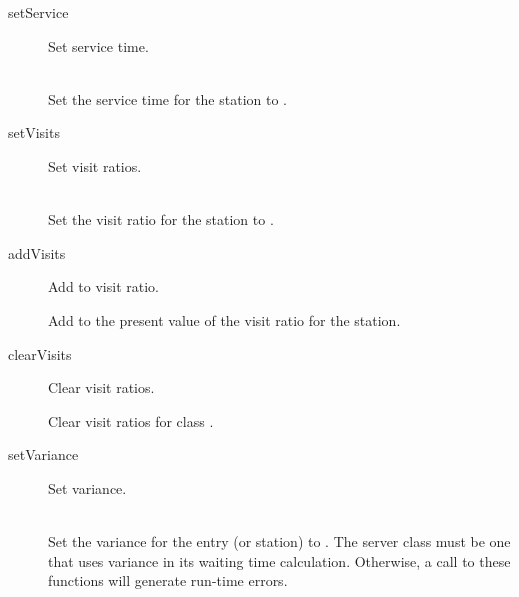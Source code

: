 \begin{description}
\item[setService] \texonly{---} Set service time.\\
  \\

  Set the service time for the station to .  

\item[setVisits] \texonly{---} Set visit ratios.\\
  \\

  Set the visit ratio for the station to .

\item[addVisits] \texonly{---} Add to visit ratio.\\

  Add  to the present value of the visit ratio for the station.

\item[clearVisits] \texonly{---} Clear visit ratios.\\

  Clear visit ratios for class .

\item[setVariance] \texonly{---} Set variance.\\
  \\

  Set the variance for the entry (or station) to .  The server
  class must be one that uses variance in its waiting time calculation.
  Otherwise, a call to these functions will generate run-time errors.
\end{description}

